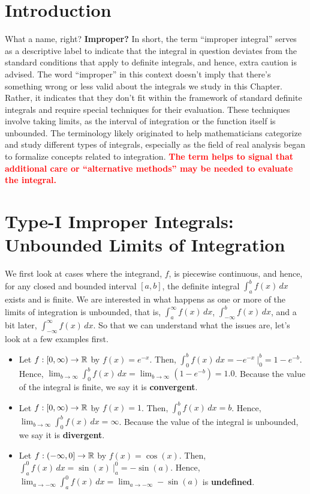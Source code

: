 \section{Introduction}

What a name, right? \textbf{Improper?} In short, the term ``improper integral'' serves as a descriptive label to indicate that the integral in question deviates from the standard conditions that apply to definite integrals, and hence, extra caution is advised. The word ``improper'' in this context doesn't imply that there's something wrong or less valid about the integrals we study in this Chapter. Rather, it indicates that they don't fit within the framework of standard definite integrals and require special techniques for their evaluation. These techniques involve taking limits, as the interval of integration or the function itself is unbounded. The terminology likely originated to help mathematicians categorize and study different types of integrals, especially as the field of real analysis began to formalize concepts related to integration. \textcolor{red}{\bf The term helps to signal that additional care or ``alternative methods'' may be needed to evaluate the integral.}



\section{Type-I Improper Integrals: Unbounded Limits of Integration}

We first look at cases where the integrand, $f$, is piecewise continuous, and hence, for any closed and bounded interval $[a, b]$, the definite integral $\int_a^b f(x) \, dx$ exists and is finite. We are interested in what happens as one or more of the limits of integration is unbounded, that is, $\int_a^\infty f(x) \, dx$,  $\int_{-\infty}^b f(x) \, dx$, and a bit later,  $\int_{-\infty}^\infty f(x) \, dx$. So that we can understand what the issues are, let's look at a few examples first.
\begin{itemize}
    \item Let $f:[0, \infty) \to \mathbb R$ by $f(x) = e^{-x}$. Then, $\int_0^b f(x) \, dx = -e^{-x}~\bigg|_0^b = 1 - e^{-b}$. Hence, $\displaystyle \lim_{b \to \infty}  \int_0^b f(x) \, dx = \lim_{b \to \infty} \left(1 - e^{-b}\right) = 1.0$. Because the value of the integral is finite, we say it is \textbf{convergent}.
    \item Let $f:[0, \infty) \to \mathbb R$ by $f(x) = 1$. Then, $\int_0^b f(x) \, dx = b$. Hence, $\displaystyle \lim_{b \to \infty} \int_0^b f(x) \, dx = \infty$. Because the value of the integral is unbounded, we say it is \textbf{divergent}.
    \item Let $f:(-\infty, 0] \to \mathbb R$ by $f(x) = \cos(x)$. Then, $\int_a^0 f(x) \, dx = \sin(x)~\bigg|_{a}^0 = -\sin(a)$. Hence, $\displaystyle \lim_{a \to -\infty}  \int_a^0 f(x) \, dx = \lim_{a \to -\infty} -\sin(a)$ is \textbf{undefined}.
\end{itemize}

